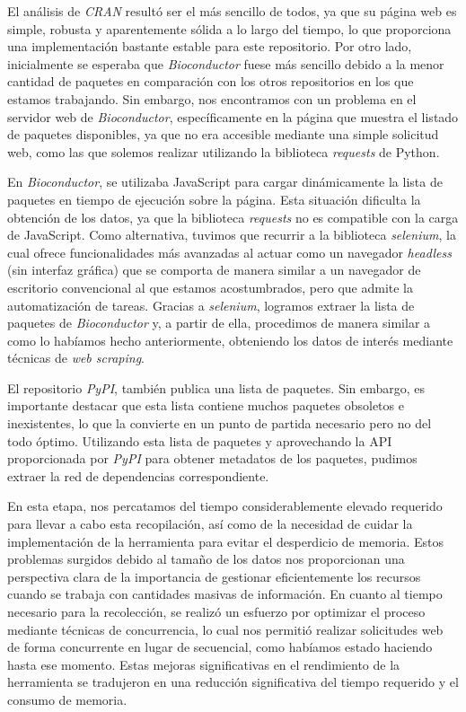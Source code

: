 El análisis de \textit{CRAN} resultó ser el más sencillo de todos, ya que su página web es simple, robusta y aparentemente 
sólida a lo largo del tiempo, lo que proporciona una implementación bastante estable para este repositorio. Por otro 
lado, inicialmente se esperaba que \textit{Bioconductor} fuese más sencillo debido a la menor cantidad de paquetes en 
comparación con los otros repositorios en los que estamos trabajando. Sin embargo, nos encontramos con un problema en 
el servidor web de \textit{Bioconductor}, específicamente en la página que muestra el listado de paquetes disponibles, 
ya que no era accesible mediante una simple solicitud web, como las que solemos realizar utilizando la biblioteca 
\textit{requests} de Python.

En \textit{Bioconductor}, se utilizaba JavaScript para cargar dinámicamente la lista de paquetes en tiempo de ejecución 
sobre la página. Esta situación dificulta la obtención de los datos, ya que la biblioteca \textit{requests} no es 
compatible con la carga de JavaScript. Como alternativa, tuvimos que recurrir a la biblioteca \textit{selenium}, la 
cual ofrece funcionalidades más avanzadas al actuar como un navegador \textit{headless} (sin interfaz gráfica) que 
se comporta de manera similar a un navegador de escritorio convencional al que estamos acostumbrados, pero que admite 
la automatización de tareas. Gracias a \textit{selenium}, logramos extraer la lista de paquetes de \textit{Bioconductor} 
y, a partir de ella, procedimos de manera similar a como lo habíamos hecho anteriormente, obteniendo los datos de interés 
mediante técnicas de \textit{web scraping}.

El repositorio \textit{PyPI}, también publica una lista de paquetes. Sin embargo, es importante destacar que esta 
lista contiene muchos paquetes obsoletos e inexistentes, lo que la convierte en un punto de partida necesario pero 
no del todo óptimo. Utilizando esta lista de paquetes y aprovechando la API proporcionada por \textit{PyPI} para 
obtener metadatos de los paquetes, pudimos extraer la red de dependencias correspondiente.

En esta etapa, nos percatamos del tiempo considerablemente elevado requerido para llevar a cabo esta recopilación, 
así como de la necesidad de cuidar la implementación de la herramienta para evitar el desperdicio de memoria. 
Estos problemas surgidos debido al tamaño de los datos nos proporcionan una perspectiva clara de la importancia de 
gestionar eficientemente los recursos cuando se trabaja con cantidades masivas de información. En cuanto al tiempo 
necesario para la recolección, se realizó un esfuerzo por optimizar el proceso mediante técnicas de concurrencia, 
lo cual nos permitió realizar solicitudes web de forma concurrente en lugar de secuencial, como habíamos estado haciendo 
hasta ese momento. Estas mejoras significativas en el rendimiento de la herramienta se tradujeron en una reducción 
significativa del tiempo requerido y el consumo de memoria.

